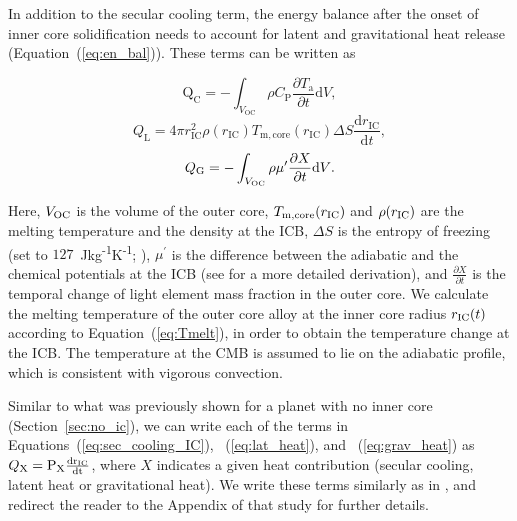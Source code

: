 \documentclass[draft]{agujournal2019} %
\begin{document}
In addition to the secular cooling term, the energy balance after the onset of inner core solidification needs to account for latent and gravitational heat release (Equation~(\ref{eq:en_bal})). These terms can be written as
\begin{linenomath*}
\begin{equation} \label{eq:sec_cooling_IC}
{\mathrm{Q}_{\mathrm{C}}=-\int_{V_{\mathrm{OC}}} \rho C_{\mathrm{P}} \frac{\partial T_{\mathrm{a}}}{\partial t} \mathrm{d} V},
\end{equation}
\begin{equation} \label{eq:lat_heat}
	{Q_{\mathrm{L}}=4 \pi r_{\mathrm{IC}}^{2} \rho\left(r_{\mathrm{IC}}\right) T_{\mathrm{m,core}}\left(r_{\mathrm{IC}}\right) \Delta S \frac{\mathrm{d} r_{\mathrm{IC}}}{\mathrm{d} t}},
\end{equation}
\begin{equation} \label{eq:grav_heat}
	{Q_{\rm G}=-\int_{V_{\rm OC}} \rho \mu^{\prime} \frac{\partial X}{\partial t} \mathrm{d} V}.
\end{equation}
\end{linenomath*}
Here, $V_{\rm OC}$ is the volume of the outer core, $T_{\rm m,core}(r_{\rm IC})$ and $\rho(r_{\rm IC})$ are the melting temperature and the density at the ICB, $\Delta S$ is the entropy of freezing (set to $127$~Jkg\textsuperscript{-1}K\textsuperscript{-1}; ), $\mu^{\prime}$ is the difference between the adiabatic and the chemical potentials at the ICB (see  for a more detailed derivation), and $\frac{\partial X}{\partial t}$ is the temporal change of light element mass fraction in the outer core. We calculate the melting temperature of the outer core alloy at the inner core radius $r_{\rm IC}(t)$ according to Equation~(\ref{eq:Tmelt}), in order to obtain the temperature change at the ICB. The temperature at the CMB is assumed to lie on the adiabatic profile, which is consistent with vigorous convection. 

Similar to what was previously shown for a planet with no inner core (Section~\ref{sec:no_ic}), we can write each of the terms in Equations~(\ref{eq:sec_cooling_IC}), ~(\ref{eq:lat_heat}), and ~(\ref{eq:grav_heat}) as $Q_{\rm X}=\mathrm{P}_{\rm X}\frac{\rm{d}r_{\rm IC}}{\rm{d}t}$, where $X$ indicates a given heat contribution (secular cooling, latent heat or gravitational heat). We write these terms similarly as in , and redirect the reader to the Appendix of that study for further details.  
\end{document}

